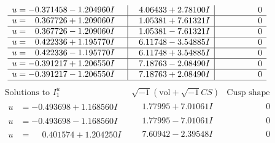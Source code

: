\documentclass[1p]{elsarticle_modified}
\theoremstyle{definition}
\newcommand{\I}{\sqrt{-1}}
\begin{document}
$$\begin{array}{c|c|c}
\begin{aligned}
u &= -0.371458 - 1.204960 I\end{aligned}
 & \phantom{-}4.06433 + 2.78100 I & \phantom{-0.000000 } 0 \\ \hline\begin{aligned}
u &= \phantom{-}0.367726 + 1.209060 I\end{aligned}
 & \phantom{-}1.05381 + 7.61321 I & \phantom{-0.000000 } 0 \\ \hline\begin{aligned}
u &= \phantom{-}0.367726 - 1.209060 I\end{aligned}
 & \phantom{-}1.05381 - 7.61321 I & \phantom{-0.000000 } 0 \\ \hline\begin{aligned}
u &= \phantom{-}0.422336 + 1.195770 I\end{aligned}
 & \phantom{-}6.11748 - 3.54885 I & \phantom{-0.000000 } 0 \\ \hline\begin{aligned}
u &= \phantom{-}0.422336 - 1.195770 I\end{aligned}
 & \phantom{-}6.11748 + 3.54885 I & \phantom{-0.000000 } 0 \\ \hline\begin{aligned}
u &= -0.391217 + 1.206550 I\end{aligned}
 & \phantom{-}7.18763 - 2.08490 I & \phantom{-0.000000 } 0 \\ \hline\begin{aligned}
u &= -0.391217 - 1.206550 I\end{aligned}
 & \phantom{-}7.18763 + 2.08490 I & \phantom{-0.000000 } 0\\
 \hline 
 \end{array}$$\newpage$$\begin{array}{c|c|c}  
\text{Solutions to }I^u_{1}& \I (\text{vol} + \sqrt{-1}CS) & \text{Cusp shape}\\
 \hline 
\begin{aligned}
u &= -0.493698 + 1.168560 I\end{aligned}
 & \phantom{-}1.77995 + 7.01061 I & \phantom{-0.000000 } 0 \\ \hline\begin{aligned}
u &= -0.493698 - 1.168560 I\end{aligned}
 & \phantom{-}1.77995 - 7.01061 I & \phantom{-0.000000 } 0 \\ \hline\begin{aligned}
u &= \phantom{-}0.401574 + 1.204250 I\end{aligned}
 & \phantom{-}7.60942 - 2.39548 I & \phantom{-0.000000 } 0 \\ \hline\begin{aligned}

\end{aligned}
\end{array}$$
\end{document}

